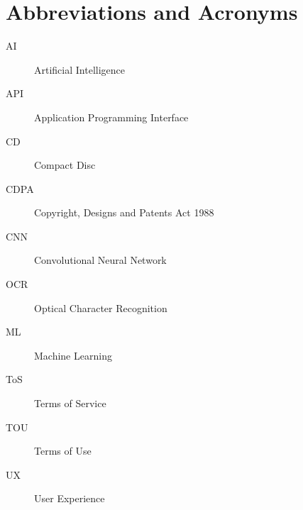     \makeatletter
    \title{\xmp@Title}
    \studentid{\xmp@Author}
    \makeatother
    
    \maketitle
    
    
    \uomtoc
    \uomlof
    \uomlot
    
    \section*{Abbreviations and Acronyms}
    
      \begin{description}
        \item[AI] Artificial Intelligence
        \item[API] Application Programming Interface
        \item[CD] Compact Disc
        \item[CDPA] Copyright, Designs and Patents Act 1988
        \item[CNN] Convolutional Neural Network
        \item[OCR] Optical Character Recognition
        \item[ML] Machine Learning
        \item[ToS] Terms of Service
        \item[TOU] Terms of Use
        \item[UX] User Experience
      \end{description}
    
